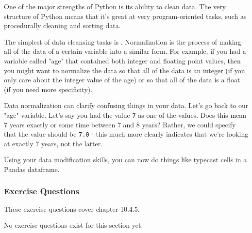 One of the major strengths of Python is its ability to clean data. The very structure of Python means that it's great at very program-oriented tasks, such as procedurally cleaning and sorting data.\par
The simplest of data cleansing tasks is . Normalization is the process of making all of the data of a certain variable into a similar form. For example, if you had a variable called "age" that contained both integer and floating point values, then you might want to normalize the data so that all of the data is an integer (if you only care about the integer value of the age) or so that all of the data is a float (if you need more specificity).\par
Data normalization can clarify confusing things in your data. Let's go back to our "age" variable. Let's say you had the value \verb|7| as one of the values. Does this mean 7 years exactly or some time between 7 and 8 years? Rather, we could specify that the value should be \verb|7.0| - this much more clearly indicates that we're looking at exactly 7 years, not the latter.\par
Using your data modification skills, you can now do things like typecast cells in a Pandas dataframe.

\subsubsection*{Exercise Questions}
These exercise questions cover chapter 10.4.5.

No exercise questions exist for this section yet.

